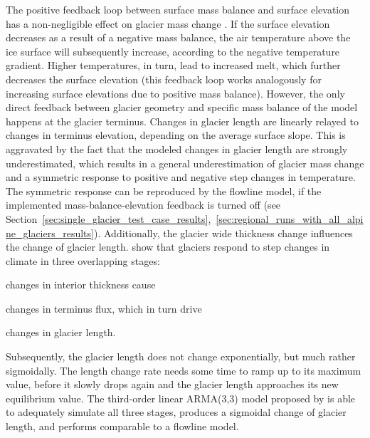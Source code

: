     The positive feedback loop between surface mass balance and surface elevation has a non-negligible effect on glacier mass change \citep{Huss2012a, Schafer2015}. If the surface elevation decreases as a result of a negative mass balance, the air temperature above the ice surface will subsequently increase, according to the negative temperature gradient. Higher temperatures, in turn, lead to increased melt, which further decreases the surface elevation (this feedback loop works analogously for increasing surface elevations due to positive mass balance). However, the only direct feedback between glacier geometry and specific mass balance of the \vas{} model happens at the glacier terminus.
    Changes in glacier length are linearly relayed to changes in terminus elevation, depending on the average surface slope. This is aggravated by the fact that the modeled changes in glacier length are strongly underestimated, which results in a general underestimation of glacier mass change and a symmetric response to positive and negative step changes in temperature. The symmetric response can be reproduced by the flowline model, if the implemented mass-balance-elevation feedback is turned off (see Section~\ref{sec:single_glacier_test_case_results},~\ref{sec:regional_runs_with_all_alpine_glaciers_results}). Additionally, the glacier wide thickness change influences the change of glacier length. \citet{Roe2014} show that glaciers respond to step changes in climate in three overlapping stages:
    \begin{enumerate*}[label=(\arabic*)]
        \item changes in interior thickness cause
        \item changes in terminus flux, which in turn drive
        \item changes in glacier length.
    \end{enumerate*}
    Subsequently, the glacier length does not change exponentially, but much rather sigmoidally. The length change rate needs some time to ramp up to its maximum value, before it slowly drops again and the glacier length approaches its new equilibrium value. The third-order linear ARMA(3,3) model proposed by \citet{Roe2014} is able to adequately simulate all three stages, produces a sigmoidal change of glacier length, and performs comparable to a flowline model.

